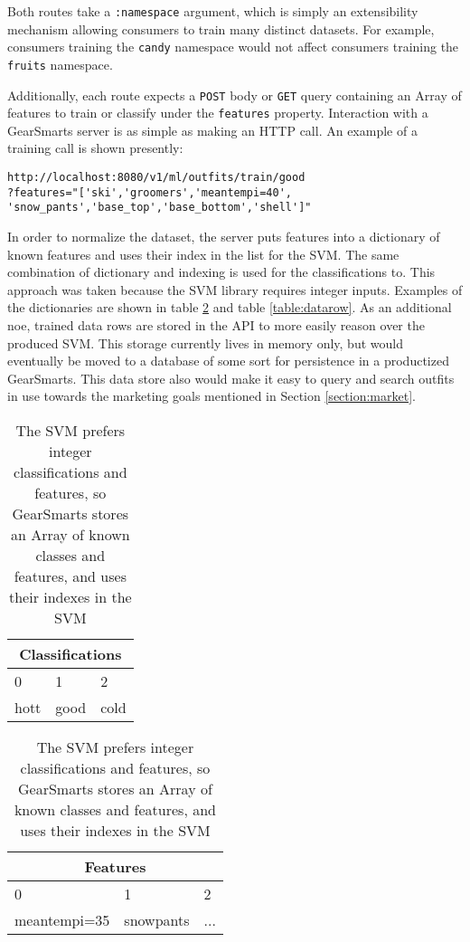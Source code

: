 Both routes take a \texttt{:namespace} argument, which is simply an extensibility mechanism allowing consumers to train
many distinct datasets. For example, consumers training the \texttt{candy} namespace would not affect consumers training
the \texttt{fruits} namespace.

Additionally, each route expects a \texttt{POST} body or \texttt{GET} query containing an Array of features to
train or classify under the \texttt{features} property. Interaction with a GearSmarts server is as simple as
making an HTTP call. An example of a training call is shown presently:

\begin{lstlisting}
http://localhost:8080/v1/ml/outfits/train/good
?features="['ski','groomers','meantempi=40',
'snow_pants','base_top','base_bottom','shell']"
\end{lstlisting}



In order to normalize the dataset, the server puts features into a dictionary of known features and uses their index
in the list for the SVM. The same combination of dictionary and indexing is used for the classifications to. This approach
was taken because the SVM library requires integer inputs. Examples of the dictionaries are shown in table
\ref{table:dictionary} and table \ref{table:datarow}. As an additional noe,
trained data rows are stored in the API to more easily reason over the produced SVM. This storage currently lives in
memory only, but would eventually be moved to a database of some sort for persistence in a productized GearSmarts.
This data store also would make it easy to query and search outfits in use towards the marketing goals mentioned in
Section \ref{section:market}.

\begin{table}
    \begin{tabular}{lll}
        \hline
        \multicolumn{3}{c}{Classifications} \\
        \hline
        0 & 1 & 2 \\
        hott & good & cold \\
        \hline
        \hline
    \end{tabular}
    \begin{tabular}{lll}
        \multicolumn{3}{c}{Features} \\
        \hline
        0 & 1 & 2 \\
        meantempi=35 & snowpants & ... \\
        \hline
    \end{tabular}
    \caption{The SVM prefers integer classifications and features, so GearSmarts stores an Array of known classes and features,
    and uses their indexes in the SVM}
    \label{table:dictionary}
\end{table}

